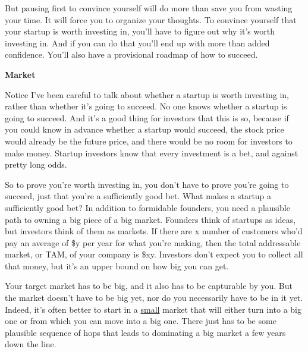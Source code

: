 But pausing first to
                  convince yourself will do more than save you from wasting your
                  time. It will force you to organize your thoughts. To convince
                  yourself that your startup is worth investing in, you'll have
                  to figure out why it's worth investing in. And if you can do
                  that you'll end up with more than added confidence. You'll
                  also have a provisional roadmap of how to succeed.

\textbf{Market}

Notice I've been careful to talk about whether a
                  startup is worth investing in, rather than whether it's going
                  to succeed. No one knows whether a startup is going to
                  succeed. And it's a good thing for investors that this is so,
                  because if you could know in advance whether a startup would
                  succeed, the stock price would already be the future price,
                  and there would be no room for investors to make money.
                  Startup investors know that every investment is a bet, and
                  against pretty long odds.

So to prove you're worth
                  investing in, you don't have to prove you're going to succeed,
                  just that you're a sufficiently good bet. What makes a startup
                  a sufficiently good bet? In addition to formidable founders,
                  you need a plausible path to owning a big piece of a big
                  market. Founders think of startups as ideas, but investors
                  think of them as markets. If there are x number of customers
                  who'd pay an average of \$y per year for what you're making,
                  then the total addressable market, or TAM, of your company is
                  \$xy. Investors don't expect you to collect all that money, but
                  it's an upper bound on how big you can get.

Your
                  target market has to be big, and it also has to be capturable
                  by you. But the market doesn't have to be big yet, nor do you
                  necessarily have to be in it yet. Indeed, it's often better to
                  start in a \href{http://www.paulgraham.com/ds.html}{small} market that will either
                  turn into a big one or from which you can move into a big one.
                  There just has to be some plausible sequence of hops that
                  leads to dominating a big market a few years down the line.

